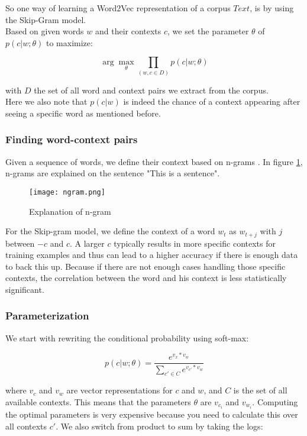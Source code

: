 So one way of learning a Word2Vec representation of a corpus $Text$, is by using the Skip-Gram model. \\
Based on given words $w$ and their contexts $c$, we set the parameter $\theta$ of $p(c|w;\theta)$ to maximize:

\begin{equation} 
\arg \max_{\theta} \prod_{(w,c \in D)} p(c|w;\theta)
\end{equation}

\noindent with $D$ the set of all word and context pairs we extract from the corpus.\\
Here we also note that $p(c|w)$ is indeed the chance of a context appearing after seeing a specific word as mentioned before.

\subsubsection{Finding word-context pairs}

Given a sequence of words, we define their context based on n-grams \cite{w2vNgram:article}. In figure \ref{fig:ngram}, n-grams are explained on the sentence "This is a sentence". 

\begin{figure}[htbp]
	\centering
	\texttt{[image: ngram.png]}
	\caption{Explanation of n-gram \cite{w2vNgram:online}}
	\label{fig:ngram}
\end{figure} 

For the Skip-gram model, we define the context of a word $w_t$ as $w_{t+j}$ with $j$ between $-c$ and $c$. A larger $c$ typically results in more specific contexts for training examples and thus can lead to a higher accuracy if there is enough data to back this up. Because if there are not enough cases handling those specific contexts, the correlation between the word and his context is less statistically significant.


\subsubsection{Parameterization}

We start with rewriting the conditional probability using soft-max:

\begin{equation} 
p(c|w;\theta) = \frac{e^{v_x*v_w}}{\sum_{c' \in C}e^{v_{c'}*v_w}}
\end{equation}

\noindent where $v_c$ and $v_w$ are vector representations for $c$ and $w$, and $C$ is the set of all available contexts. This means that the parameters $\theta$ are $v_{c_i}$ and $v_{w_i}$. Computing the optimal parameters is very expensive because you need to calculate this over all contexts $c'$. We also switch from product to sum by taking the logs:

